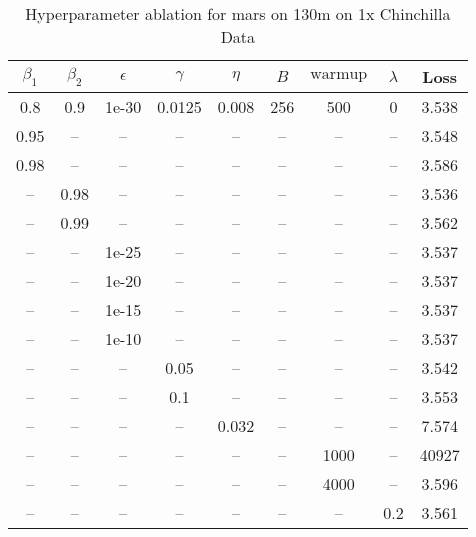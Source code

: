 \begin{table}[h!]
\centering
\caption{Hyperparameter ablation for mars on 130m on 1x Chinchilla Data}
\label{tab:ablation_mars_130m_on_1x_chinchilla_data}
\begin{tabular}{ccccccccc}
\toprule
$\beta_1$ & $\beta_2$ & $\epsilon$ & $\gamma$ & $\eta$ & $B$ & $\mathrm{warmup}$ & $\lambda$ & Loss \\
\midrule
0.8 & 0.9 & 1e-30 & 0.0125 & 0.008 & 256 & 500 & 0 & 3.538 \\
\midrule
0.95 & -- & -- & -- & -- & -- & -- & -- & 3.548 \\
0.98 & -- & -- & -- & -- & -- & -- & -- & 3.586 \\
-- & 0.98 & -- & -- & -- & -- & -- & -- & 3.536 \\
-- & 0.99 & -- & -- & -- & -- & -- & -- & 3.562 \\
-- & -- & 1e-25 & -- & -- & -- & -- & -- & 3.537 \\
-- & -- & 1e-20 & -- & -- & -- & -- & -- & 3.537 \\
-- & -- & 1e-15 & -- & -- & -- & -- & -- & 3.537 \\
-- & -- & 1e-10 & -- & -- & -- & -- & -- & 3.537 \\
-- & -- & -- & 0.05 & -- & -- & -- & -- & 3.542 \\
-- & -- & -- & 0.1 & -- & -- & -- & -- & 3.553 \\
-- & -- & -- & -- & 0.032 & -- & -- & -- & 7.574 \\
-- & -- & -- & -- & -- & -- & 1000 & -- & 40927 \\
-- & -- & -- & -- & -- & -- & 4000 & -- & 3.596 \\
-- & -- & -- & -- & -- & -- & -- & 0.2 & 3.561 \\
\bottomrule
\end{tabular}
\end{table}

